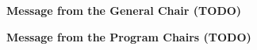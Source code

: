 \documentclass[11pt,a4paper]{article}
\begin{document}
\begin{center}
  {\Large \bf Message from the General Chair (TODO)}
\end{center}

\vspace*{0.5cm}

\pagebreak

\begin{center}
  {\Large \bf Message from the Program Chairs (TODO)}
\end{center}

\vspace*{0.5cm}
\end{document}
